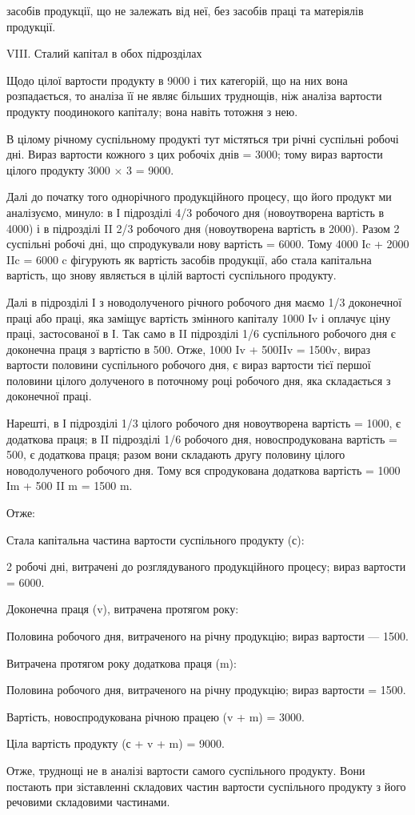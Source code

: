 \parcont{}  %
засобів продукції, що не залежать від неї, без засобів праці та матеріялів
продукції.

VIII. Сталий капітал в обох підрозділах

Щодо цілої вартости продукту в 9000 і тих категорій, що на них
вона розпадається, то аналіза її не являє більших труднощів, ніж аналіза
вартости продукту поодинокого капіталу; вона навіть тотожня з нею.

В цілому річному суспільному продукті тут містяться три річні суспільні
робочі дні. Вираз вартости кожного з цих робочіх днів = 3000; тому
вираз вартости цілого продукту 3000 × 3 = 9000.

Далі до початку того однорічного продукційного процесу, що його
продукт ми аналізуємо, минуло: в І підрозділі 4/3 робочого дня (новоутворена
вартість в 4000) і в підрозділі II 2/3 робочого дня (новоутворена
вартість в 2000). Разом 2 суспільні робочі дні, що спродукували
нову вартість = 6000. Тому 4000 Іc + 2000 IIc = 6000 c фігурують
як вартість засобів продукції, або стала капітальна вартість, що
знову являється в цілій вартості суспільного продукту.

Далі в підрозділі І з новодолученого річного робочого дня маємо 1/3
доконечної праці або праці, яка заміщує вартість змінного капіталу 1000
Іv і оплачує ціну праці, застосованої в І. Так само в II підрозділі 1/6 суспільного
робочого дня є доконечна праця з вартістю в 500. Отже, 1000
Iv + 500IIv = 1500v, вираз вартости половини суспільного робочого
дня, є вираз вартости тієї першої половини цілого долученого в поточному
році робочого дня, яка складається з доконечної праці.

Нарешті, в І підрозділі 1/3 цілого робочого дня новоутворена вартість =
1000, є додаткова праця; в II підрозділі 1/6 робочого дня, новоспродукована
вартість = 500, є додаткова праця; разом вони складають другу
половину цілого новодолученого робочого дня. Тому вся спродукована
додаткова вартість = 1000 Іm + 500 II m = 1500 m.

Отже:

Стала капітальна частина вартости суспільного продукту (с):

2 робочі дні, витрачені до розглядуваного продукційного процесу;
вираз вартости = 6000.

Доконечна праця (v), витрачена протягом року:

Половина робочого дня, витраченого на річну продукцію; вираз вартости
— 1500.

Витрачена протягом року додаткова праця (m):

Половина робочого дня, витраченого на річну продукцію; вираз вартости
= 1500.

Вартість, новоспродукована річною працею (v + m) = 3000.

Ціла вартість продукту (с + v + m) = 9000.

Отже, труднощі не в аналізі вартости самого суспільного продукту.
Вони постають при зіставленні складових частин вартости суспільного
продукту з його речовими складовими частинами.
